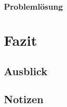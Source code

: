 \documentclass[12pt,a4paper]{report}
\begin{document}
  \subsection{Problemlösung}   


\chapter*{Fazit}
\setcounter{section}{0}

\section{Ausblick}

\section{Notizen}
\end{document}
